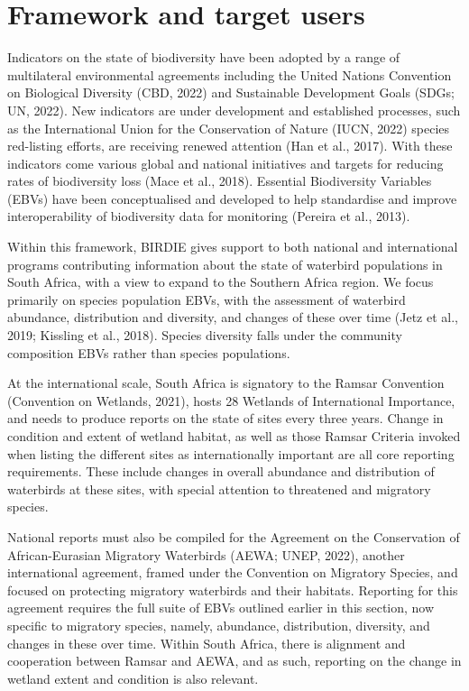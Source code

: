 \documentclass[utf8]{frontiersSCNS}
\begin{document}
\hypertarget{framework-and-target-users}{%
\section*{Framework and target users}\label{framework-and-target-users}}

Indicators on the state of biodiversity have been adopted by a range of
multilateral environmental agreements including the United Nations
Convention on Biological Diversity (CBD, 2022) and Sustainable
Development Goals (SDGs; UN, 2022). New indicators are under development
and established processes, such as the International Union for the
Conservation of Nature (IUCN, 2022) species red-listing efforts, are
receiving renewed attention (Han et al., 2017). With these indicators
come various global and national initiatives and targets for reducing
rates of biodiversity loss (Mace et al., 2018). Essential Biodiversity
Variables (EBVs) have been conceptualised and developed to help
standardise and improve interoperability of biodiversity data for
monitoring (Pereira et al., 2013).

Within this framework, BIRDIE gives support to both national and
international programs contributing information about the state of
waterbird populations in South Africa, with a view to expand to the
Southern Africa region. We focus primarily on species population EBVs,
with the assessment of waterbird abundance, distribution and diversity,
and changes of these over time (Jetz et al., 2019; Kissling et al.,
2018). Species diversity falls under the community composition EBVs
rather than species populations.

At the international scale, South Africa is signatory to the Ramsar
Convention (Convention on Wetlands, 2021), hosts 28 Wetlands of
International Importance, and needs to produce reports on the state of
sites every three years. Change in condition and extent of wetland
habitat, as well as those Ramsar Criteria invoked when listing the
different sites as internationally important are all core reporting
requirements. These include changes in overall abundance and
distribution of waterbirds at these sites, with special attention to
threatened and migratory species.

National reports must also be compiled for the Agreement on the
Conservation of African-Eurasian Migratory Waterbirds (AEWA; UNEP,
2022), another international agreement, framed under the Convention on
Migratory Species, and focused on protecting migratory waterbirds and
their habitats. Reporting for this agreement requires the full suite of
EBVs outlined earlier in this section, now specific to migratory
species, namely, abundance, distribution, diversity, and changes in
these over time. Within South Africa, there is alignment and cooperation
between Ramsar and AEWA, and as such, reporting on the change in wetland
extent and condition is also relevant.
\end{document}
